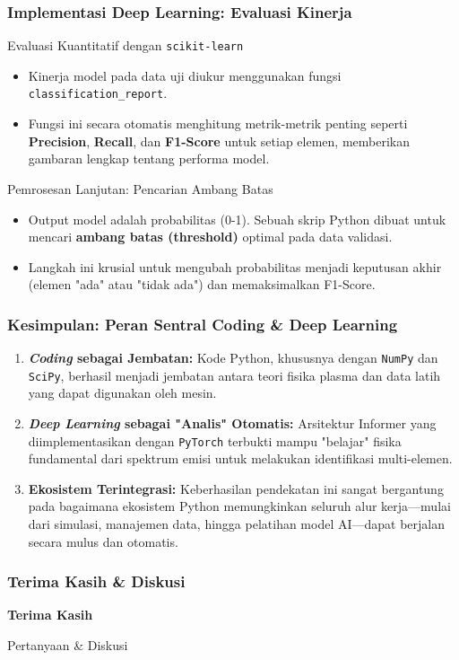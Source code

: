 \documentclass{beamer}
\begin{document}
\begin{frame}
  \frametitle{Implementasi Deep Learning: Evaluasi Kinerja}

  \begin{block}{Evaluasi Kuantitatif dengan \texttt{scikit-learn}}
    \begin{itemize}
        \item Kinerja model pada data uji diukur menggunakan fungsi \texttt{classification\_report}.
        \item Fungsi ini secara otomatis menghitung metrik-metrik penting seperti \textbf{Precision}, \textbf{Recall}, dan \textbf{F1-Score} untuk setiap elemen, memberikan gambaran lengkap tentang performa model.
    \end{itemize}
  \end{block}
  
  \begin{block}{Pemrosesan Lanjutan: Pencarian Ambang Batas}
    \begin{itemize}
        \item Output model adalah probabilitas (0-1). Sebuah skrip Python dibuat untuk mencari \textbf{ambang batas (threshold)} optimal pada data validasi.
        \item Langkah ini krusial untuk mengubah probabilitas menjadi keputusan akhir (elemen "ada" atau "tidak ada") dan memaksimalkan F1-Score.
    \end{itemize}
  \end{block}
\end{frame}

\begin{frame}
  \frametitle{Kesimpulan: Peran Sentral Coding \& Deep Learning}
  
  \begin{enumerate}
    \item \textbf{\textit{Coding} sebagai Jembatan:} Kode Python, khususnya dengan \texttt{NumPy} dan \texttt{SciPy}, berhasil menjadi jembatan antara teori fisika plasma dan data latih yang dapat digunakan oleh mesin.
    
    \item \textbf{\textit{Deep Learning} sebagai "Analis" Otomatis:} Arsitektur Informer yang diimplementasikan dengan \texttt{PyTorch} terbukti mampu "belajar" fisika fundamental dari spektrum emisi untuk melakukan identifikasi multi-elemen.
    
    \item \textbf{Ekosistem Terintegrasi:} Keberhasilan pendekatan ini sangat bergantung pada bagaimana ekosistem Python memungkinkan seluruh alur kerja—mulai dari simulasi, manajemen data, hingga pelatihan model AI—dapat berjalan secara mulus dan otomatis.
  \end{enumerate}
  
  \vspace{1em}
  \centering
\end{frame}

\begin{frame}
  \frametitle{Terima Kasih \& Diskusi}
  
  \vfill
  \centering
  \Huge{\textbf{Terima Kasih}}
  \vspace{2em}
  
  \Large{Pertanyaan \& Diskusi}
  \vfill
\end{frame}
\end{document}
